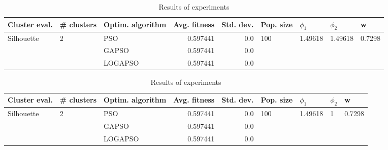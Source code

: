 \documentclass{article}
\begin{document}
\begin{table}
\centering
\caption{Results of experiments}
\begin{tabular}{lllrrllll}
\toprule
              Cluster eval. &        \# clusters & Optim. algorithm &  Avg. fitness &  Std. dev. &            Pop. size &               $\phi_{1}$ &               $\phi_{2}$ &                       w \\
\midrule
\multirow{3}{*}{Silhouette} & \multirow{3}{*}{2} &              PSO &      0.597441 &        0.0 & \multirow{3}{*}{100} & \multirow{3}{*}{1.49618} & \multirow{3}{*}{1.49618} & \multirow{3}{*}{0.7298} \\
                            &                    &            GAPSO &      0.597441 &        0.0 &                      &                          &                          &                         \\
                            &                    &          LOGAPSO &      0.597441 &        0.0 &                      &                          &                          &                         \\
\bottomrule
\end{tabular}
\end{table}
\begin{table}
\centering
\caption{Results of experiments}
\begin{tabular}{lllrrllll}
\toprule
              Cluster eval. &        \# clusters & Optim. algorithm &  Avg. fitness &  Std. dev. &            Pop. size &               $\phi_{1}$ &         $\phi_{2}$ &                       w \\
\midrule
\multirow{3}{*}{Silhouette} & \multirow{3}{*}{2} &              PSO &      0.597441 &        0.0 & \multirow{3}{*}{100} & \multirow{3}{*}{1.49618} & \multirow{3}{*}{1} & \multirow{3}{*}{0.7298} \\
                            &                    &            GAPSO &      0.597441 &        0.0 &                      &                          &                    &                         \\
                            &                    &          LOGAPSO &      0.597441 &        0.0 &                      &                          &                    &                         \\
\bottomrule
\end{tabular}
\end{table}
\end{document}
